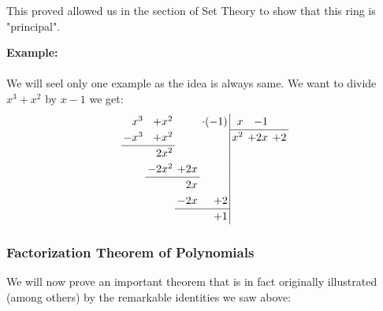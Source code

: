 	\begin{tcolorbox}[title=Remark,colframe=black,arc=10pt]
	This proved allowed us in the section of Set Theory to show that this ring is "principal".
	\end{tcolorbox}
	\begin{tcolorbox}[colframe=black,colback=white,sharp corners]
	\textbf{{\Large {}}Example:}\\\\
	We will seel only one example as the idea is always same. We want to divide $x^3+x^2$ by $x-1$ we get:
	\begin{equation}
		\renewcommand{\arraystretch}{1.2}
		\renewcommand{\arraycolsep}{2pt}
		  \begin{array}{rrrr|rrr}
		 x^3&+x^2 &   &\cdot(-1)&x  &-1 &  \\
		\cline{5-7}
		-x^3&+x^2 &   &  &x^2&+2x&+2\\
		\cline{1-2}
		    &2x^2 &   &  &   &   &  \\
		    &-2x^2&+2x&  &   &   &  \\
		    \cline{2-3}
		    &     &2x &  &   &   &  \\
		    &     &-2x&+2&   &   &  \\
		              \cline{3-4}
		    &     &   &+1&   &   &  \\ 
		  \end{array}
	\end{equation}	
	\end{tcolorbox}
	
	
	\pagebreak
	\subsubsection{Factorization Theorem of Polynomials}\label{factorization theorem}
	We will now prove an important theorem that is in fact originally illustrated (among others) by the remarkable identities we saw above:
	
